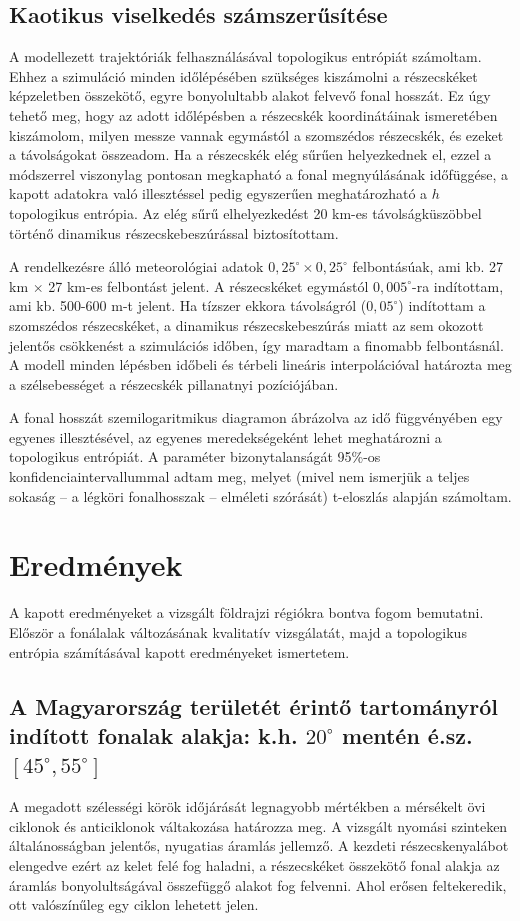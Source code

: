 \documentclass[12pt,a4paper]{article}
\begin{document}
\subsection{Kaotikus viselkedés számszerűsítése}
A modellezett trajektóriák felhasználásával topologikus entrópiát számoltam. Ehhez a szimuláció minden időlépésében szükséges kiszámolni a részecskéket képzeletben összekötő, egyre bonyolultabb alakot felvevő fonal hosszát. Ez úgy tehető meg, hogy az adott időlépésben a részecskék koordinátáinak ismeretében kiszámolom, milyen messze vannak egymástól a szomszédos részecskék, és ezeket a távolságokat összeadom. Ha a részecskék elég sűrűen helyezkednek el, ezzel a módszerrel viszonylag pontosan megkapható a fonal megnyúlásának időfüggése, a kapott adatokra való illesztéssel pedig egyszerűen meghatározható a $h$ topologikus entrópia. Az elég sűrű elhelyezkedést 20 km-es távolságküszöbbel történő dinamikus részecskebeszúrással biztosítottam.

A rendelkezésre álló meteorológiai adatok $0,25^\circ \times 0,25^\circ$ felbontásúak, ami kb. 27 km $\times$ 27 km-es felbontást jelent. A részecskéket egymástól $0,005 ^\circ$-ra indítottam, ami kb. 500-600 m-t jelent. Ha tízszer ekkora távolságról ($0,05^\circ$) indítottam a szomszédos részecskéket, a dinamikus részecskebeszúrás miatt az sem okozott jelentős csökkenést a szimulációs időben, így maradtam a finomabb felbontásnál. A modell minden lépésben időbeli és térbeli lineáris interpolációval határozta meg a szélsebességet a részecskék pillanatnyi pozíciójában.

A fonal hosszát szemilogaritmikus diagramon ábrázolva az idő függvényében egy egyenes illesztésével, az egyenes meredekségeként lehet meghatározni a topologikus entrópiát. A paraméter bizonytalanságát 95\%-os konfidenciaintervallummal adtam meg, melyet (mivel nem ismerjük a teljes sokaság -- a légköri fonalhosszak -- elméleti szórását) t-eloszlás alapján számoltam.

\section{Eredmények}
A kapott eredményeket a vizsgált földrajzi régiókra bontva fogom bemutatni. Először a fonálalak változásának kvalitatív vizsgálatát, majd a topologikus entrópia számításával kapott eredményeket ismertetem.

\subsection{A Magyarország területét érintő tartományról indított fonalak alakja: k.h. $20^\circ$ mentén é.sz. $[45^\circ, 55^\circ]$}
A megadott szélességi körök időjárását legnagyobb mértékben a mérsékelt övi ciklonok és anticiklonok váltakozása határozza meg. A vizsgált nyomási szinteken általánosságban jelentős, nyugatias áramlás jellemző. A kezdeti részecskenyalábot elengedve ezért az kelet felé fog haladni, a részecskéket összekötő fonal alakja az áramlás bonyolultságával összefüggő alakot fog felvenni. Ahol erősen feltekeredik, ott valószínűleg egy ciklon lehetett jelen.
\end{document}
